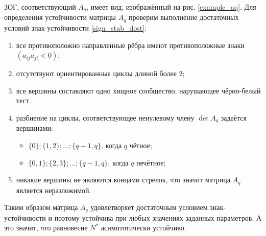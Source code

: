     ЗОГ, соответствующий \(A_q\), имеет вид, изображённый на рис. \ref{example_aq}. Для определения устойчивости матрицы \(A_q\) проверим выполнение достаточных условий знак-устойчивости \eqref{sign_stab_dost}:
    \begin{enumerate}
        \item все противоположно направленные рёбра имеют противоположные знаки \((a_{ij} a_{ji} < 0)\);
        \item отсутствуют ориентированные циклы длиной более \(2\);
        \item все вершины составляют одно хищное сообщество, нарушающее чёрно-белый тест.
        \item разбиение на циклы, соответствующее ненулевому члену \(\det A_q\) задаётся вершинами:
        \begin{itemize}
            \item \(\{0\}; \{1,2\}; \dots; \{q-1, q\}\), когда \(q\) чётное;
            \item \(\{0, 1\}; \{2,3\}; \dots; \{q-1, q\}\), когда \(q\) нечётное;
        \end{itemize}
        \item никакие вершины не являются концами стрелок, что значит матрица \(A_q\) является неразложимой.
    \end{enumerate}
    
    Таким образом матрица \(A_q\) удовлетворяет достаточным условием знак-устойчивости и поэтому устойчива при любых значениях заданных параметров. А это значит, что равновесие \(N^*\) асимптотически устойчиво.

